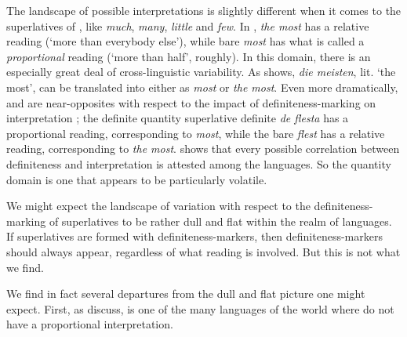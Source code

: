 \documentclass[output=paper
,modfonts
,nonflat]{langsci/langscibook}
\begin{document}
The landscape of possible interpretations is slightly different when it comes to  the superlatives of , like  \textit{much}, \textit{many}, \textit{little} and \textit{few}. In , \textit{the most} has a relative reading (`more than everybody else'), while bare \textit{most} has what is called a \textit{proportional} reading (`more than half', roughly). In this domain, there is an especially great deal of cross-linguistic variability. As \citet{Hackl2009} shows,  \textit{die meisten}, lit. `the most', can be translated into  either as \textit{most} or \textit{the most}. Even more dramatically,  and  are near-opposites with respect to the impact of definiteness-marking on interpretation \citep{CoppockJosefson2015}; the definite quantity superlative definite \textit{de flesta} has a proportional reading, corresponding to  \textit{most}, while the bare \textit{flest} has a relative reading, corresponding to  \textit{the most}. \citet{Coppocktoappear} shows that every possible correlation between definiteness and interpretation is attested among the  languages. So the quantity domain is one that appears to be particularly volatile.

We might expect the landscape of variation with respect to the definiteness-marking of superlatives to be rather dull and flat within the realm of  languages. If superlatives are formed with definiteness-markers, then definiteness-markers should always appear, regardless of what reading is involved. But this is not what we find.


We find in fact several departures from the dull and flat picture one might expect. First, as \citet{Dobrovie-SorinGiurgea2015} discuss,  is one of the many languages of the world where  do not have a proportional interpretation.

\z

\z
\end{document}
